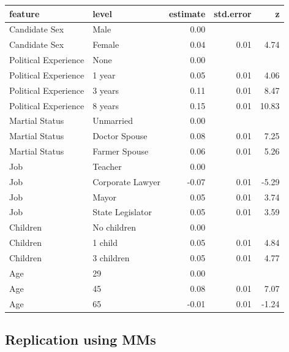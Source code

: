 \documentclass[a4paper,12pt]{article}\usepackage[]{graphicx}\usepackage[]{color}
\begin{document}
\begin{table}[ht]
\centering
\begin{tabular}{lp{1.5in}rrr}
  \hline
feature & level & estimate & std.error & z \\ 
  \hline
Candidate Sex & Male & 0.00 &  &  \\ 
  Candidate Sex & Female & 0.04 & 0.01 & 4.74 \\ 
  Political Experience & None & 0.00 &  &  \\ 
  Political Experience & 1 year & 0.05 & 0.01 & 4.06 \\ 
  Political Experience & 3 years & 0.11 & 0.01 & 8.47 \\ 
  Political Experience & 8 years & 0.15 & 0.01 & 10.83 \\ 
  Martial Status & Unmarried & 0.00 &  &  \\ 
  Martial Status & Doctor Spouse & 0.08 & 0.01 & 7.25 \\ 
  Martial Status & Farmer Spouse & 0.06 & 0.01 & 5.26 \\ 
  Job & Teacher & 0.00 &  &  \\ 
  Job & Corporate Lawyer & -0.07 & 0.01 & -5.29 \\ 
  Job & Mayor & 0.05 & 0.01 & 3.74 \\ 
  Job & State Legislator & 0.05 & 0.01 & 3.59 \\ 
  Children & No children & 0.00 &  &  \\ 
  Children & 1 child & 0.05 & 0.01 & 4.84 \\ 
  Children & 3 children & 0.05 & 0.01 & 4.77 \\ 
  Age & 29 & 0.00 &  &  \\ 
  Age & 45 & 0.08 & 0.01 & 7.07 \\ 
  Age & 65 & -0.01 & 0.01 & -1.24 \\ 
   \hline
\end{tabular}
\end{table}


\clearpage

\subsection{Replication using MMs}
\end{document}
